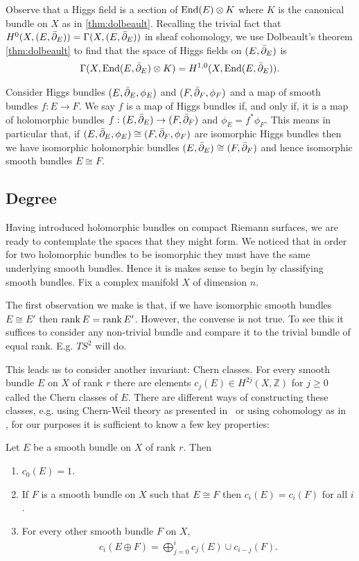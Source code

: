 \documentclass[12pt]{ociamthesis}  %
\begin{document}
Observe that a Higgs field is a section of $\operatorname{End}(E) \otimes K$
where $K$ is the canonical bundle on $X$ as in \ref{thm:dolbeault}.
Recalling the trivial fact that $H^0(X,(E,{\bar{\partial}}_E))=\Gamma(X,(E,{\bar{\partial}}_E))$
in sheaf cohomology, we use Dolbeault's theorem \ref{thm:dolbeault} to
find that the space of Higgs fields on $(E,{\bar{\partial}}_E)$ is
\begin{align*}
  \Gamma(X,\operatorname{End}(E,{\bar{\partial}}_E)\otimes K) = H^{1,0}(X,\operatorname{End}(E,{\bar{\partial}}_E)).
\end{align*}

Consider Higgs bundles $(E,{\bar{\partial}}_E,\phi_E)$ and $(F,{\bar{\partial}}_F,\phi_F)$
and a map of smooth bundles $f:E\to F$. We say $f$ is a map of Higgs
bundles if, and only if, it is a map of holomorphic bundles
$f:(E,{\bar{\partial}}_E)\to (F,{\bar{\partial}}_F)$ and $\phi_E = f^*\phi_F$.
This means in particular that, if
$(E,{\bar{\partial}}_E,\phi_E)\cong(F,{\bar{\partial}}_F,\phi_F)$
are isomorphic Higgs bundles then we have isomorphic holomorphic bundles
$(E,{\bar{\partial}}_E)\cong(F,{\bar{\partial}}_F)$ and hence isomorphic smooth bundles
$E\cong F$.

\subsection{Degree}

Having introduced holomorphic bundles on compact Riemann surfaces,
we are ready to contemplate the spaces that they might form.
We noticed that in order for two holomorphic bundles to be isomorphic
they must have the same underlying smooth bundles. Hence it is makes
sense to begin by classifying smooth bundles. Fix a complex manifold $X$
of dimension $n$.

The first observation we make is that, if we have isomorphic smooth
bundles $E\cong E'$ then $\operatorname{rank} E = \operatorname{rank} E'$. However, the converse
is not true. To see this it suffices to consider any non-trivial
bundle and compare it to the trivial bundle of equal rank. E.g.
$TS^2$ will do.

This leads us to consider another invariant: Chern classes. For
every smooth bundle $E$ on $X$ of rank $r$ there are elements
$c_j(E)\in H^{2j}(X,\mathbb{Z})$ for $j\geq 0$ called the Chern
classes of $E$. There are different ways of constructing these classes,
e.g. using Chern-Weil theory as presented in~\cite[Chapter 2]{fine2013}
or using cohomology as in~\cite{griffiths1994} , for our purposes
it is sufficient to know a few key properties:

\begin{lemma}\label{lem:chern_classes}
  Let $E$ be a smooth bundle on $X$ of rank $r$. Then
  \begin{enumerate}
    \item $c_0(E) = 1$.
    \item If $F$ is a smooth bundle on $X$ such that $E\cong F$
          then $c_i(E) = c_i(F)$ for all $i$.
    \item For every other smooth bundle $F$ on $X$,
          \begin{align*}
            c_i(E\oplus F) = \bigoplus_{j=0}^{i} c_j(E)\cup c_{i-j}(F).
          \end{align*}
  \end{enumerate}
\end{lemma}
\end{document}
